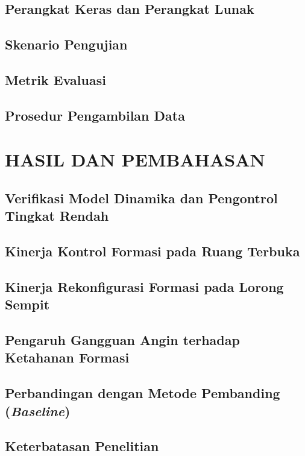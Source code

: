 \documentclass[12pt,a4paper]{report}
\begin{document}
\section{Perangkat Keras dan Perangkat Lunak}
\section{Skenario Pengujian}
\section{Metrik Evaluasi}
\section{Prosedur Pengambilan Data}

\chapter{HASIL DAN PEMBAHASAN}
\section{Verifikasi Model Dinamika dan Pengontrol Tingkat Rendah}
\section{Kinerja Kontrol Formasi pada Ruang Terbuka}
\section{Kinerja Rekonfigurasi Formasi pada Lorong Sempit}
\section{Pengaruh Gangguan Angin terhadap Ketahanan Formasi}
\section{Perbandingan dengan Metode Pembanding (\textit{Baseline})}
\section{Keterbatasan Penelitian}
\end{document}
